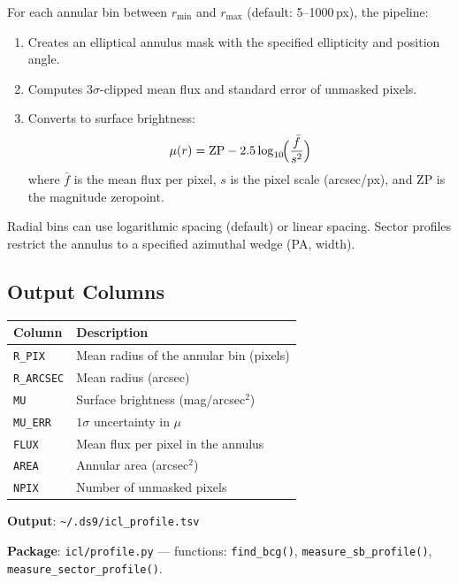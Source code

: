 \documentclass[11pt,fleqn]{book}
\begin{document}
For each annular bin between $r_\mathrm{min}$ and $r_\mathrm{max}$ (default: 5--1000\,px), the pipeline:
\begin{enumerate}[leftmargin=2em]
  \item Creates an elliptical annulus mask with the specified ellipticity and position angle.
  \item Computes $3\sigma$-clipped mean flux and standard error of unmasked pixels.
  \item Converts to surface brightness:
  \begin{equation}
    \mu(r) = \mathrm{ZP} - 2.5\log_{10}\!\Bigl(\frac{\bar{f}}{s^2}\Bigr)
  \end{equation}
  where $\bar{f}$ is the mean flux per pixel, $s$ is the pixel scale (arcsec/px), and ZP is the magnitude zeropoint.
\end{enumerate}

Radial bins can use logarithmic spacing (default) or linear spacing.  Sector profiles restrict the annulus to a specified azimuthal wedge (PA, width).

\subsection{Output Columns}

\begin{center}
\begin{tabular}{ll}
\toprule
\textbf{Column} & \textbf{Description} \\
\midrule
\texttt{R\_PIX} & Mean radius of the annular bin (pixels) \\
\texttt{R\_ARCSEC} & Mean radius (arcsec) \\
\texttt{MU} & Surface brightness (mag/arcsec$^2$) \\
\texttt{MU\_ERR} & $1\sigma$ uncertainty in $\mu$ \\
\texttt{FLUX} & Mean flux per pixel in the annulus \\
\texttt{AREA} & Annular area (arcsec$^2$) \\
\texttt{NPIX} & Number of unmasked pixels \\
\bottomrule
\end{tabular}
\end{center}

\textbf{Output}: \texttt{\textasciitilde/.ds9/icl\_profile.tsv}

\textbf{Package}: \texttt{icl/profile.py} --- functions: \texttt{find\_bcg()}, \texttt{measure\_sb\_profile()}, \texttt{measure\_sector\_profile()}.
\end{document}
